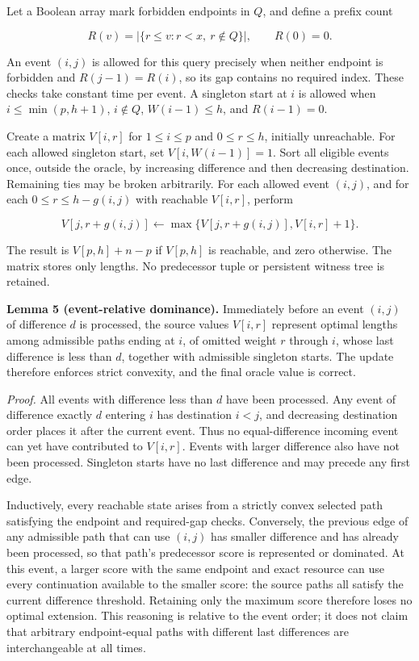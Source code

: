 \documentclass[
  11pt,
  letterpaper,
]{article}
\begin{document}
Let a Boolean array mark forbidden endpoints in \(Q\), and define a
prefix count

\[R(v)=|\{r\leq v:r<x,\ r\notin Q\}|,\qquad R(0)=0.\]

An event \((i,j)\) is allowed for this query precisely when neither
endpoint is forbidden and \(R(j-1)=R(i)\), so its gap contains no
required index. These checks take constant time per event. A singleton
start at \(i\) is allowed when \(i\leq\min(p,h+1)\), \(i\notin Q\),
\(W(i-1)\leq h\), and \(R(i-1)=0\).

Create a matrix \(V[i,r]\) for \(1\leq i\leq p\) and \(0\leq r\leq h\),
initially unreachable. For each allowed singleton start, set
\(V[i,W(i-1)]=1\). Sort all eligible events once, outside the oracle, by
increasing difference and then decreasing destination. Remaining ties
may be broken arbitrarily. For each allowed event \((i,j)\), and for
each \(0\leq r\leq h-g(i,j)\) with reachable \(V[i,r]\), perform

\[V[j,r+g(i,j)]\gets\max\{V[j,r+g(i,j)],V[i,r]+1\}.\]

The result is \(V[p,h]+n-p\) if \(V[p,h]\) is reachable, and zero
otherwise. The matrix stores only lengths. No predecessor tuple or
persistent witness tree is retained.

\textbf{Lemma 5 (event-relative dominance).} Immediately before an event
\((i,j)\) of difference \(d\) is processed, the source values \(V[i,r]\)
represent optimal lengths among admissible paths ending at \(i\), of
omitted weight \(r\) through \(i\), whose last difference is less than
\(d\), together with admissible singleton starts. The update therefore
enforces strict convexity, and the final oracle value is correct.

\emph{Proof.} All events with difference less than \(d\) have been
processed. Any event of difference exactly \(d\) entering \(i\) has
destination \(i<j\), and decreasing destination order places it after
the current event. Thus no equal-difference incoming event can yet have
contributed to \(V[i,r]\). Events with larger difference also have not
been processed. Singleton starts have no last difference and may precede
any first edge.

Inductively, every reachable state arises from a strictly convex
selected path satisfying the endpoint and required-gap checks.
Conversely, the previous edge of any admissible path that can use
\((i,j)\) has smaller difference and has already been processed, so that
path's predecessor score is represented or dominated. At this event, a
larger score with the same endpoint and exact resource can use every
continuation available to the smaller score: the source paths all
satisfy the current difference threshold. Retaining only the maximum
score therefore loses no optimal extension. This reasoning is relative
to the event order; it does not claim that arbitrary endpoint-equal
paths with different last differences are interchangeable at all times.
\end{document}

